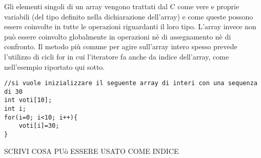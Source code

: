 Gli elementi singoli di un array vengono trattati dal C come vere e proprie variabili (del tipo definito nella dichiarazione dell'array) e come queste possono essere coinvolte in tutte le operazioni riguardanti il loro tipo. L'array invece non può essere coinvolto globalmente in operazioni nè di assegnamento nè di confronto. Il metodo più comune per agire sull'array intero spesso prevede l'utilizzo di cicli for in cui l'iteratore fa anche da indice dell'array, come nell'esempio riportato qui sotto.
\begin{lstlisting}[title={Implementazione di un array}]
//si vuole inizializzare il seguente array di interi con una sequenza di 30
int voti[10];
int i;
for(i=0; i<10; i++){
	voti[i]=30;
}
\end{lstlisting}




SCRIVI COSA PUò ESSERE USATO COME INDICE